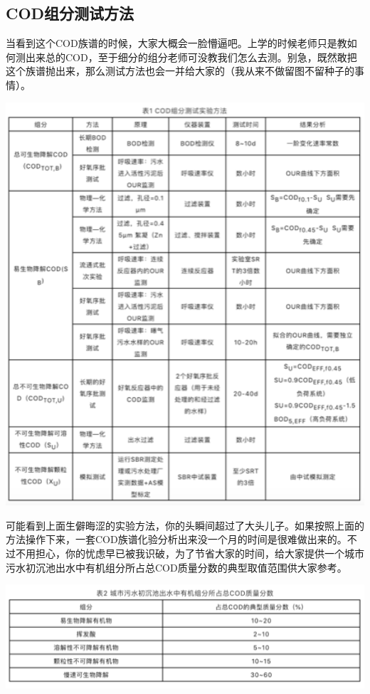 \documentclass[
]{book}
\begin{document}
\hypertarget{codux7ec4ux5206ux6d4bux8bd5ux65b9ux6cd5}{%
\subsection{COD组分测试方法}\label{codux7ec4ux5206ux6d4bux8bd5ux65b9ux6cd5}}

当看到这个COD族谱的时候，大家大概会一脸懵逼吧。上学的时候老师只是教如何测出来总的COD，至于细分的组分老师可没教我们怎么去测。别急，既然敢把这个族谱抛出来，那么测试方法也会一并给大家的（我从来不做留图不留种子的事情）。

\includegraphics[width=5.93in]{images/cod2}

可能看到上面生僻晦涩的实验方法，你的头瞬间超过了大头儿子。如果按照上面的方法操作下来，一套COD族谱化验分析出来没一个月的时间是很难做出来的。不过不用担心，你的忧虑早已被我识破，为了节省大家的时间，给大家提供一个城市污水初沉池出水中有机组分所占总COD质量分数的典型取值范围供大家参考。

\includegraphics[width=6.67in]{images/cod3}
\end{document}
